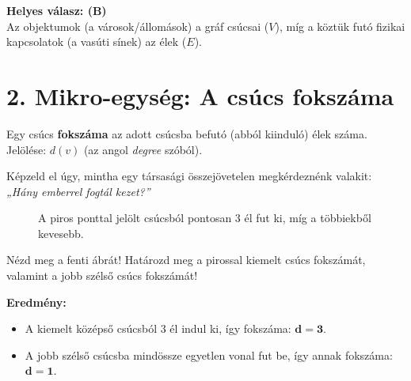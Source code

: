 \documentclass[a4paper,12pt]{article}
\begin{document}
\begin{megoldasdoboz}
\textbf{Helyes válasz: (B)} \\
Az objektumok (a városok/állomások) a gráf csúcsai ($V$), míg a köztük futó fizikai kapcsolatok (a vasúti sínek) az élek ($E$).
\end{megoldasdoboz}

\vspace{0.4cm}
\section{2. Mikro-egység: A csúcs fokszáma}

\begin{definiciodoboz}[Fokszám]
Egy csúcs \textbf{fokszáma} az adott csúcsba befutó (abból kiinduló) élek száma. \\
Jelölése: $d(v)$ (az angol \textit{degree} szóból).
\end{definiciodoboz}

Képzeld el úgy, mintha egy társasági összejövetelen megkérdeznénk valakit: \textit{„Hány emberrel fogtál kezet?”}

\begin{figure}[H]
    \centering
    \caption{A piros ponttal jelölt csúcsból pontosan 3 él fut ki, míg a többiekből kevesebb.}
\end{figure}

\begin{feladatdoboz}
Nézd meg a fenti ábrát! Határozd meg a pirossal kiemelt csúcs fokszámát, valamint a jobb szélső csúcs fokszámát!
\end{feladatdoboz}

\begin{megoldasdoboz}
\textbf{Eredmény:}
\begin{itemize}
    \item A kiemelt középső csúcsból 3 él indul ki, így fokszáma: $\mathbf{d = 3}$.
    \item A jobb szélső csúcsba mindössze egyetlen vonal fut be, így annak fokszáma: $\mathbf{d = 1}$.
\end{itemize}
\end{megoldasdoboz}
\end{document}
